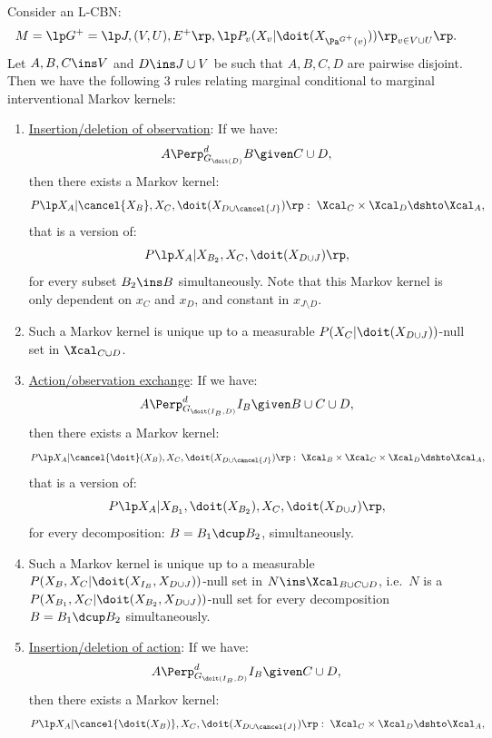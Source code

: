 \begin{Prp}
    \label{prp:do-calculus}
    Consider an L-CBN:
    \[M= \lp G^+=\lp J,(V,U),E^+ \rp, \lp P_v ( X_v|\doit( X_{\Pa^{G^+}(v)})) \rp_{v \in V \cup U} \rp.\]
    Let $A,B,C \ins V$ and $D \ins J \cup V$ be such that $A,B,C,D$ are pairwise disjoint.\\
    Then we have the following 3 rules relating marginal conditional to marginal interventional Markov kernels:
    \begin{enumerate}
        \item \underline{Insertion/deletion of observation}: If we have:
            \[ A \Perp^d_{G_{\doit(D)}} B \given C \cup D,   \]
            then there exists a Markov kernel:
            \[ P\lp X_A|\cancel{X_B},X_C,\doit(X_{D\cup \cancel{J}})\rp:\;  \Xcal_C \times \Xcal_{D} \dshto \Xcal_A, \]
            that is a version of:
            \[P\lp X_A|X_{B_2},X_C,\doit(X_{D\cup J})\rp,\] 
            for every subset $B_2 \ins B$ simultaneously.
            Note that this Markov kernel is only dependent on $x_C$ and $x_D$, and constant in $x_{J\setminus D}$.
        \item[] Such a Markov kernel is unique up to a measurable $P(X_C|\doit(X_{D\cup J}))$-null set in $\Xcal_{C\cup D}$. 
         \item \underline{Action/observation exchange}: If we have:
            \[ A \Perp^d_{G_{\doit(I_B,D)}} I_B \given B \cup C \cup D,   \]
            then there exists a Markov kernel:
            \[P\lp X_A|\cancel{\doit}(X_B),X_C,\doit(X_{D\cup \cancel{J}})\rp: \;\Xcal_B \times \Xcal_C \times \Xcal_{D} \dshto \Xcal_A,\]
            that is a version of:            
            \[ P\lp X_A|X_{B_1},\doit(X_{B_2}),X_C,\doit(X_{D\cup J})\rp, \]
            for every decomposition: $B=B_1\dcup B_2$, simultaneously.
        \item[] Such a Markov kernel is unique up to a measurable $P(X_B,X_C|\doit(X_{I_B},X_{D\cup J}))$-null set in $N \ins \Xcal_{B \cup C\cup D}$, i.e.\ $N$ is a $P(X_{B_1},X_C|\doit(X_{B_2},X_{D\cup J}))$-null set
            for every decomposition $B=B_1\dcup B_2$ simultaneously.
        \item \underline{Insertion/deletion of action}: If we have:
            \[ A \Perp^d_{G_{\doit(I_B,D)}} I_B \given C  \cup D,   \]
            then there exists a Markov kernel: 
            \[P\lp X_A|\cancel{\doit(X_B)},X_C,\doit(X_{D\cup \cancel{J}})\rp:\; \Xcal_C \times \Xcal_{D} \dshto \Xcal_A,\] 

\end{enumerate}
\end{Prp}
